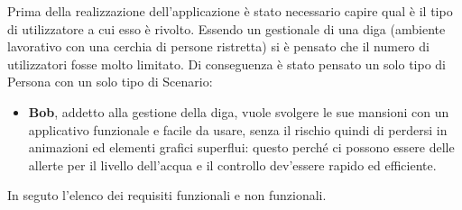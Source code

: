 \documentclass[a4paper,12pt]{report}
\begin{document}
Prima della realizzazione dell'applicazione è stato necessario capire qual è il tipo di utilizzatore a cui esso è rivolto. Essendo un gestionale di una diga (ambiente lavorativo con una cerchia di persone ristretta) si è pensato che il numero di utilizzatori fosse molto limitato. Di conseguenza è stato pensato un solo tipo di Persona con un solo tipo di Scenario:
\begin{itemize}
    \item \textbf{Bob}, addetto alla gestione della diga, vuole svolgere le sue mansioni con un applicativo funzionale e facile da usare, senza il rischio quindi di perdersi in animazioni ed elementi grafici superflui: questo perché ci possono essere delle allerte per il livello dell'acqua e il controllo dev'essere rapido ed efficiente.
\end{itemize}
In seguto l'elenco dei requisiti funzionali e non funzionali.
\end{document}
